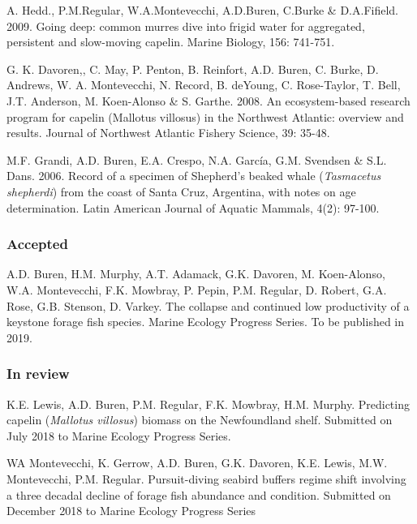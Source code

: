 \documentclass{res}
\begin{document}
\begin{resume}
\begin{hangparas}{.4in}{1}
A. Hedd., P.M.Regular, W.A.Montevecchi, A.D.Buren, C.Burke \& D.A.Fifield. 2009. Going deep: common murres dive into frigid water for aggregated, persistent and slow-moving capelin. Marine Biology, 156: 741-751.

G. K. Davoren,, C. May, P. Penton, B. Reinfort, A.D. Buren, C. Burke, D. Andrews, W. A. Montevecchi, N. Record, B. deYoung, C. Rose-Taylor, T. Bell, J.T. Anderson, M. Koen-Alonso \& S. Garthe. 2008. An ecosystem-based research program for capelin (Mallotus villosus) in the Northwest Atlantic: overview and results. Journal of Northwest Atlantic Fishery Science, 39: 35-48.

M.F. Grandi, A.D. Buren, E.A. Crespo, N.A. García, G.M. Svendsen \& S.L. Dans. 2006. Record of a specimen of Shepherd’s beaked whale (\textit{Tasmacetus shepherdi}) from the coast of Santa Cruz, Argentina, with notes on age determination. Latin American Journal of Aquatic Mammals, 4(2): 97-100.
 

\end{hangparas}

\subsubsection{Accepted}
\begin{hangparas}{.4in}{1}
A.D. Buren, H.M. Murphy, A.T. Adamack, G.K. Davoren, M. Koen-Alonso, W.A. Montevecchi, F.K. Mowbray, P. Pepin, P.M. Regular, D. Robert, G.A. Rose, G.B. Stenson, D. Varkey. The collapse and continued low productivity of a keystone forage fish species. Marine Ecology Progress Series. To be published in 2019.
\end{hangparas}

\pagebreak

\subsubsection{In review}
\begin{hangparas}{.4in}{1}
K.E. Lewis, A.D. Buren, P.M. Regular, F.K. Mowbray, H.M. Murphy. Predicting capelin (\textit{Mallotus villosus}) biomass on the Newfoundland shelf. Submitted on July 2018 
to Marine Ecology Progress Series.

WA Montevecchi, K. Gerrow, A.D. Buren, G.K. Davoren, K.E. Lewis, M.W. Montevecchi, P.M. Regular. Pursuit-diving seabird buffers regime shift involving a three decadal decline of forage fish abundance and condition. Submitted on December 2018 to Marine Ecology Progress Series


\end{hangparas}
\end{resume}
\end{document}
